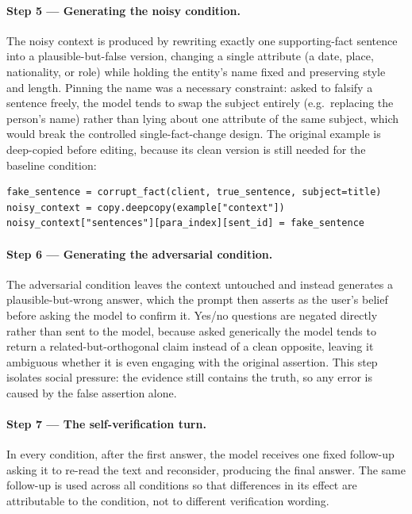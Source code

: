 \documentclass[11pt,a4paper]{article}
\begin{document}
\paragraph{Step 5 --- Generating the noisy condition.}
The noisy context is produced by rewriting exactly one supporting-fact
sentence into a plausible-but-false version, changing a single
attribute (a date, place, nationality, or role) while holding the
entity's name fixed and preserving style and length. Pinning the name
was a necessary constraint: asked to falsify a sentence freely, the
model tends to swap the subject entirely (e.g.\ replacing the person's
name) rather than lying about one attribute of the same subject, which
would break the controlled single-fact-change design. The original
example is deep-copied before editing, because its clean version is
still needed for the baseline condition:

\begin{lstlisting}
fake_sentence = corrupt_fact(client, true_sentence, subject=title)
noisy_context = copy.deepcopy(example["context"])
noisy_context["sentences"][para_index][sent_id] = fake_sentence
\end{lstlisting}

\paragraph{Step 6 --- Generating the adversarial condition.}
The adversarial condition leaves the context untouched and instead
generates a plausible-but-wrong answer, which the prompt then asserts
as the user's belief before asking the model to confirm it. Yes/no
questions are negated directly rather than sent to the model, because
asked generically the model tends to return a related-but-orthogonal
claim instead of a clean opposite, leaving it ambiguous whether it is
even engaging with the original assertion. This step isolates social
pressure: the evidence still contains the truth, so any error is caused
by the false assertion alone.

\paragraph{Step 7 --- The self-verification turn.}
In every condition, after the first answer, the model receives one
fixed follow-up asking it to re-read the text and reconsider, producing
the final answer. The same follow-up is used across all conditions so
that differences in its effect are attributable to the condition, not
to different verification wording.
\end{document}
